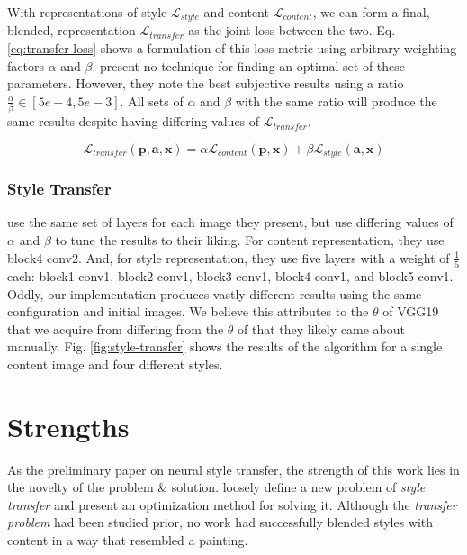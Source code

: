 \documentclass{article}
\begin{document}
With representations of style $\mathcal{L}_{style}$ and content
$\mathcal{L}_{content}$, we can form a final, blended, representation
$\mathcal{L}_{transfer}$ as the joint loss between the two. Eq.
\ref{eq:transfer-loss} shows a formulation of this loss metric using arbitrary
weighting factors $\alpha$ and $\beta$. \cite{2015arXiv150806576G} present no
technique for finding an optimal set of these parameters. However, they note
the best subjective results using a ratio $\frac{\alpha}{\beta} \in
[5e-4, 5e-3]$. All sets of $\alpha$ and $\beta$ with the same ratio will
produce the same results despite having differing values of
$\mathcal{L}_{transfer}$.

\begin{equation}
\label{eq:transfer-loss}
    \mathcal{L}_{transfer}(\mathbf{p}, \mathbf{a}, \mathbf{x}) =
    \alpha \mathcal{L}_{content}(\mathbf{p}, \mathbf{x}) +
    \beta \mathcal{L}_{style}(\mathbf{a}, \mathbf{x})
\end{equation}


\subsubsection{Style Transfer}

\cite{2015arXiv150806576G} use the same set of layers for each image they
present, but use differing values of $\alpha$ and $\beta$ to tune the results
to their liking. For content representation, they use block4 conv2. And, for
style representation, they use five layers with a weight of $\frac{1}{5}$
each: block1 conv1, block2 conv1, block3 conv1, block4 conv1, and block5
conv1. Oddly, our implementation produces vastly different results using the
same configuration and initial images. We believe this attributes to the
$\theta$ of VGG19 that we acquire from \cite{chollet2015keras} differing from
the $\theta$ of \cite{2015arXiv150806576G} that they likely came about
manually. Fig. \ref{fig:style-transfer} shows the results of the algorithm for
a single content image and four different styles.

\section{Strengths}

As the preliminary paper on neural style transfer, the strength of this work
lies in the novelty of the problem \& solution. \cite{2015arXiv150806576G}
loosely define a new problem of \textit{style transfer} and present an
optimization method for solving it. Although the \textit{transfer problem} had
been studied prior, no work had successfully blended styles with content in a
way that resembled a painting.
\end{document}
